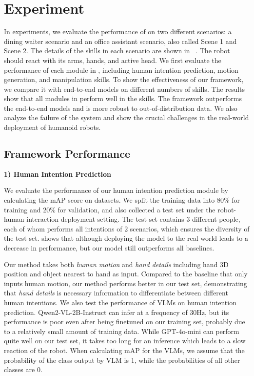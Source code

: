 
\section{Experiment}
In experiments, we evaluate the performance of \our on two different scenarios: a dining waiter scenario and an office assistant scenario, also called Scene 1 and Scene 2. The details of the skills in each scenario are shown in ~. The robot should react with its arms, hands, and active head. 
We first evaluate the performance of each module in \our, including human intention prediction, motion generation, and manipulation skills. 
To show the effectiveness of our framework, we compare it with end-to-end models on different numbers of skills. 
The results show that all modules in \our perform well in the skills. The framework outperforms the end-to-end models and is more robust to out-of-distribution data.
We also analyze the failure of the system and show the crucial challenges in the real-world deployment of humanoid robots.

\subsection{Framework Performance}
\noindent\textbf{1) Human Intention Prediction}

We evaluate the performance of our human intention prediction module by calculating the mAP score on datasets. 
We split the training data into 80\% for training and 20\% for validation, and also collected a test set under the robot-human-interaction deployment setting.
The test set contains 3 different people, each of whom performs all intentions of 2 scenarios, which ensures the diversity of the test set.
 shows that although deploying the model to the real world 
leads to a decrease in performance, but our model still outperforms all baselines.

Our method takes both \textit{human motion} and \textit{hand details} including hand 3D position and object nearest to hand as input. Compared to the baseline that only inputs human motion, our method performs better in our test set, demonstrating that \textit{hand details} is necessary information to differentiate between different human intentions. We also test the performance of VLMs on human intention prediction. Qwen2-VL-2B-Instruct can infer at a frequency of 30Hz, but its performance is poor even after being finetuned on our training set, probably due to a relatively small amount of training data. While GPT-4o-mini can perform quite well on our test set, it takes too long for an inference which leads to a slow reaction of the robot. 
When calculating mAP for the VLMs, we assume that the probability of the class output by VLM is 1, while the probabilities of all other classes are 0.

